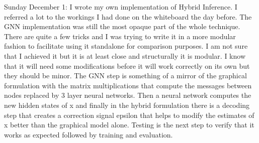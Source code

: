 \documentclass[]{../resources/final_report}
\begin{document}
\begin{appendices}
  Sunday December 1: I wrote my own implementation of Hybrid Inference. I referred a lot to the workings I had done on the whiteboard the day before. The GNN implementation was still the most opaque part of the whole technique. There are quite a few tricks and I was trying to write it in a more modular fashion to facilitate using it standalone for comparison purposes. I am not sure that I achieved it but it is at least close and structurally it is modular. I know that it will need some modifications before it will work correctly on its own but they should be minor. The GNN step is something of a mirror of the graphical formulation with the matrix multiplications that compute the messages between nodes replaced by 3 layer neural networks. Then a neural network computes the new hidden states of x and finally in the hybrid formulation there is a decoding step that creates a correction signal epsilon that helps to modify the estimates of x better than the graphical model alone. Testing is the next step to verify that it works as expected followed by training and evaluation.
  
  \end{appendices}
  
\end{document}
